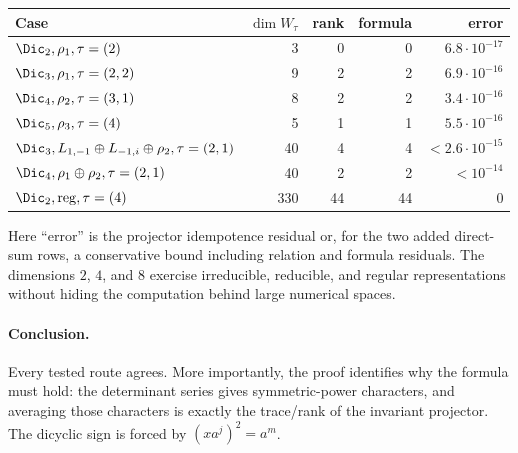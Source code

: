 \documentclass[10pt]{article}
\begin{document}
\begin{center}
\small
\begin{tabular}{@{}lrrrr@{}}
\toprule
Case & $\dim W_\tau$ & rank & formula & error\\
\midrule
$\Dic_2,\rho_1,\tau=(2)$ & 3 & 0 & 0 & $6.8\cdot10^{-17}$\\
$\Dic_3,\rho_1,\tau=(2,2)$ & 9 & 2 & 2 & $6.9\cdot10^{-16}$\\
$\Dic_4,\rho_2,\tau=(3,1)$ & 8 & 2 & 2 & $3.4\cdot10^{-16}$\\
$\Dic_5,\rho_3,\tau=(4)$ & 5 & 1 & 1 & $5.5\cdot10^{-16}$\\
$\Dic_3,L_{1,-1}\oplus L_{-1,i}\oplus\rho_2,\tau=(2,1)$ & 40 & 4 & 4 & $<2.6\cdot10^{-15}$\\
$\Dic_4,\rho_1\oplus\rho_2,\tau=(2,1)$ & 40 & 2 & 2 & $<10^{-14}$\\
$\Dic_2,\mathrm{reg},\tau=(4)$ & 330 & 44 & 44 & $0$\\
\bottomrule
\end{tabular}
\end{center}
Here ``error'' is the projector idempotence residual or, for the two added
direct-sum rows, a conservative bound including relation and formula residuals.
The dimensions $2$, $4$, and $8$ exercise irreducible, reducible, and regular
representations without hiding the computation behind large numerical spaces.

\paragraph{Conclusion.}
Every tested route agrees.  More importantly, the proof identifies why the
formula must hold: the determinant series gives symmetric-power characters,
and averaging those characters is exactly the trace/rank of the invariant
projector.  The dicyclic sign is forced by $(xa^j)^2=a^m$.
\endgroup


\clearpage
\end{document}

